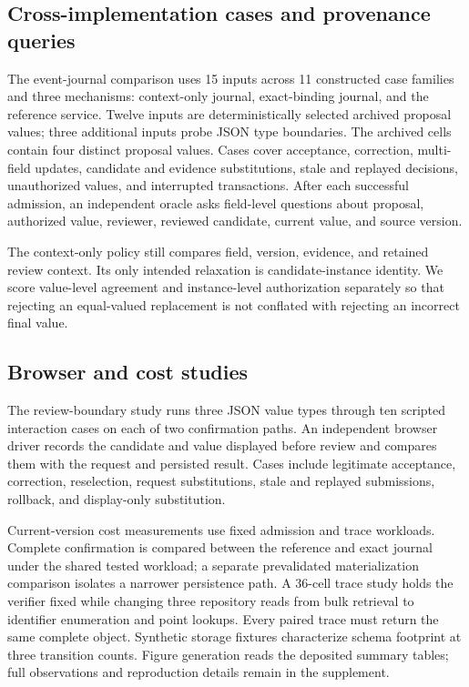 \documentclass[preprint,12pt,authoryear]{elsarticle}
\begin{document}
\subsection{Cross-implementation cases and provenance queries}

The event-journal comparison uses 15 inputs across 11 constructed case families and three mechanisms: context-only journal, exact-binding journal, and the reference service. Twelve inputs are deterministically selected archived proposal values; three additional inputs probe JSON type boundaries. The archived cells contain four distinct proposal values. Cases cover acceptance, correction, multi-field updates, candidate and evidence substitutions, stale and replayed decisions, unauthorized values, and interrupted transactions. After each successful admission, an independent oracle asks field-level questions about proposal, authorized value, reviewer, reviewed candidate, current value, and source version.

The context-only policy still compares field, version, evidence, and retained review context. Its only intended relaxation is candidate-instance identity. We score value-level agreement and instance-level authorization separately so that rejecting an equal-valued replacement is not conflated with rejecting an incorrect final value.

\subsection{Browser and cost studies}

The review-boundary study runs three JSON value types through ten scripted interaction cases on each of two confirmation paths. An independent browser driver records the candidate and value displayed before review and compares them with the request and persisted result. Cases include legitimate acceptance, correction, reselection, request substitutions, stale and replayed submissions, rollback, and display-only substitution.

Current-version cost measurements use fixed admission and trace workloads. Complete confirmation is compared between the reference and exact journal under the shared tested workload; a separate prevalidated materialization comparison isolates a narrower persistence path. A 36-cell trace study holds the verifier fixed while changing three repository reads from bulk retrieval to identifier enumeration and point lookups. Every paired trace must return the same complete object. Synthetic storage fixtures characterize schema footprint at three transition counts. Figure generation reads the deposited summary tables; full observations and reproduction details remain in the supplement.
\end{document}
